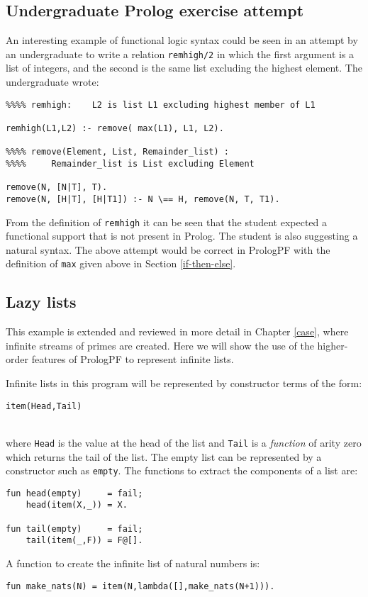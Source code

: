\subsection{Undergraduate Prolog exercise attempt}

An interesting example of functional logic syntax could be seen in an
attempt by an undergraduate to write a relation \texttt{remhigh/2} in which
the first argument is a list of integers, and the second is the same list
excluding the highest element.  The undergraduate wrote:
\begin{verbatim}
%%%% remhigh:    L2 is list L1 excluding highest member of L1

remhigh(L1,L2) :- remove( max(L1), L1, L2).

%%%% remove(Element, List, Remainder_list) :
%%%%     Remainder_list is List excluding Element

remove(N, [N|T], T).
remove(N, [H|T], [H|T1]) :- N \== H, remove(N, T, T1).
\end{verbatim}
From the definition of \texttt{remhigh} it can be seen that the student
expected a functional support that is not present in Prolog.  The student
is also suggesting a natural syntax.
The above attempt would be correct in PrologPF with the
definition of \texttt{max} given above in Section \ref{if-then-else}.

\subsection{Lazy lists}

This example is extended and reviewed in more detail in
Chapter \ref{case}, where infinite streams of primes are
created.  Here we will show the use of the higher-order features of 
PrologPF to represent infinite lists.

Infinite lists in this program will be represented by constructor
terms of the form:\\
\centerline{\texttt{item(Head,Tail)}}\\
where \texttt{Head} is the value at the head of the list and \texttt{Tail}
is a \textit{function} of arity zero which returns the tail of the list.  The empty
list can be represented by a constructor such as \texttt{empty}.
The functions to extract the components of a list are:
\begin{verbatim}
fun head(empty)     = fail;
    head(item(X,_)) = X.

fun tail(empty)     = fail;
    tail(item(_,F)) = F@[].
\end{verbatim}
A function to create the infinite list of natural numbers is:\\
\centerline{\texttt{fun make\_{}nats(N) = item(N,lambda([],make\_{}nats(N+1))).}}

